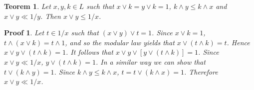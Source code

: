 \documentclass[a4paper,12pt]{article}
\numberwithin{equation}{section}
\theoremstyle{italik}
\newtheorem{teorem}{Teorem}[section]
\newtheorem*{ispat}{Proof}
\begin{document}

\begin{teorem}
    Let $ x,y,k \in L $ such that $ x \vee k = y \vee k = 1 $, $ k \wedge y \leq k \wedge x $ and $ x \vee y \ll 1/y $. 
    Then $ x \vee y \leq 1/x $.
\end{teorem}

\begin{ispat}
    Let $ t \in 1/x $ such that $ ( x \vee y ) \vee t = 1 $. Since $ x \vee k = 1 $, $ t \wedge ( x \vee k ) = t \wedge 1 $, 
    and so the modular law yields that $ x \vee ( t \wedge k ) = t $. Hence $ x \vee y \vee ( t \wedge k ) = 1 $. 
    It follows that $ x \vee y \vee \left[ y \vee ( t \wedge k ) \right] = 1 $. Since $ x \vee y \ll 1/x $, 
    $ y \vee ( t \wedge k ) = 1 $. In a similar way we can show that $ t \vee ( k \wedge y ) = 1 $. 
    Since $ k \wedge y \leq k \wedge x $, $ t = t \vee ( k \wedge x ) = 1 $. Therefore $ x \vee y \ll 1/x $.
\end{ispat}


  
\end{document}
